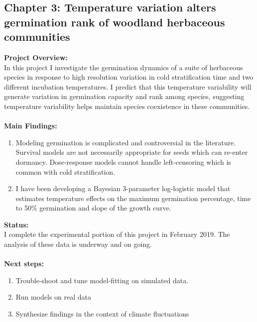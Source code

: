 \documentclass[11pt]{article}\usepackage[]{graphicx}\usepackage[]{color}
\begin{document}
\subsection*{Chapter 3: Temperature variation alters germination rank of woodland herbaceous communities}
\textbf{Project Overview:}\\
\indent In this project I investigate the germination dynamics of a suite of herbaceous species in response to high resolution variation in cold stratification time and two different incubation temperatures. I predict that this temperature variability will generate variation in germination capacity and rank among species, suggesting temperature variability helps maintain species coexistence in these communities.\\
\\
\textbf{Main Findings:}
\begin{enumerate}
\item Modeling germination is complicated and controversial in the literature. Survival models are not necessarily appropriate for seeds which can re-enter dormancy. Dose-response models cannot handle left-censoring which is common with cold stratification.
\item I have been developing a Bayesian 3-parameter log-logistic model that estimates temperature effects on the maximum germination percentage, time to 50\% germination and slope of the growth curve. 
\end{enumerate}
\textbf{Status:}\\
\indent I complete the experimental portion of this project in February 2019. The analysis of these data is underway and on going.\\
\\
\textbf{Next steps:}
\begin{enumerate}
\item Trouble-shoot and tune model-fitting on simulated data.
\item Run models on real data
\item Synthesize findings in the context of climate fluctuations
\end{enumerate}
\end{document}
